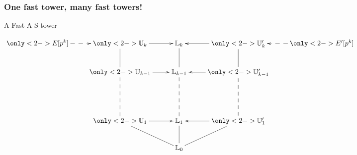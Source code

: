 \documentclass[10pt,usepdftitle=false]{beamer}
\begin{document}
\begin{frame}
  \frametitle{One fast tower, many fast towers!}
  
  \begin{center}
    A Fast A-S tower

    \smallskip

    \large$\xymatrix{
      \only<2->{E[p^k]\ar@{-->}[r]} & \only<2->{\U_k \ar@{-}[d]\ar[r]}      & \LK_k \ar@{-}[d]      & \only<2->{\U_k' \ar@{-}[d]\ar[l]}& \only<2->{E'[p^k]\ar@{-->}[l]}\\
      &\only<2->{\U_{k-1} \ar@{--}[dd]\ar[r]} & \LK_{k-1} \ar@{--}[dd] & \only<2->{\U_{k-1}' \ar@{--}[dd]\ar[l]}\\
      \\
      &\only<2->{\U_1 \ar@{-}[dr]\ar[r]}     & \LK_1 \ar@{-}[d]      & \only<2->{\U_1' \ar@{-}[dl]\ar[l]}\\
      &                    &\LK_0
    }$
  \end{center}

\end{frame}

\end{document}
